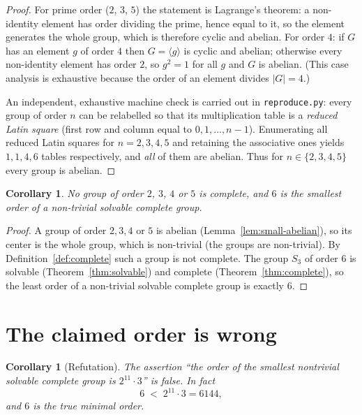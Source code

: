 \documentclass[11pt]{article}
\newtheorem{corollary}[theorem]{Corollary}
\theoremstyle{definition}
\theoremstyle{remark}
\newcommand{\Sthree}{S_3}
\begin{document}
\begin{proof}
For prime order ($2$, $3$, $5$) the statement is Lagrange's theorem: a
non-identity element has order dividing the prime, hence equal to it, so the
element generates the whole group, which is therefore cyclic and abelian. For
order $4$: if $G$ has an element $g$ of order $4$ then $G = \langle g \rangle$ is
cyclic and abelian; otherwise every non-identity element has order $2$, so
$g^2 = 1$ for all $g$ and $G$ is abelian. (This case analysis is exhaustive
because the order of an element divides $|G| = 4$.)

An independent, exhaustive machine check is carried out in
\texttt{reproduce.py}: every group of order $n$ can be relabelled so that its
multiplication table is a \emph{reduced Latin square} (first row and column
equal to $0,1,\dots,n-1$). Enumerating all reduced Latin squares for
$n = 2,3,4,5$ and retaining the associative ones yields
$1, 1, 4, 6$ tables respectively, and \emph{all} of them are abelian. Thus for
$n \in \{2,3,4,5\}$ every group is abelian.
\end{proof}

\begin{corollary}\label{cor:minimal}
No group of order $2$, $3$, $4$ or $5$ is complete, and $6$ is the smallest
order of a non-trivial solvable complete group.
\end{corollary}

\begin{proof}
A group of order $2,3,4$ or $5$ is abelian (Lemma~\ref{lem:small-abelian}), so
its center is the whole group, which is non-trivial (the groups are
non-trivial). By Definition~\ref{def:complete} such a group is not complete.
The group $\Sthree$ of order $6$ is solvable (Theorem~\ref{thm:solvable}) and
complete (Theorem~\ref{thm:complete}), so the least order of a non-trivial
solvable complete group is exactly $6$.
\end{proof}

\section{The claimed order is wrong}

\begin{corollary}[Refutation]\label{cor:refute}
The assertion ``the order of the smallest nontrivial solvable complete group is
$2^{11}\cdot 3$'' is false. In fact
\[
6 \;<\; 2^{11}\cdot 3 = 6144 ,
\]
and $6$ is the true minimal order.
\end{corollary}
\end{document}
